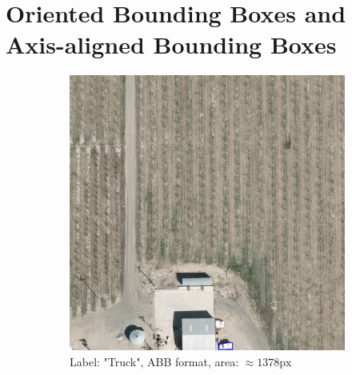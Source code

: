 \section{Oriented Bounding Boxes and Axis-aligned Bounding Boxes}
\begin{figure}[h]
    \centering
    
    \begin{subfigure}[b]{0.45\textwidth}
        \centering
        \includegraphics[trim={550pt 0pt 410pt 990pt},clip,width=\textwidth]{images/015Results/01abb_vs_obb/abb_truck.png}
        \caption{Label: "Truck", ABB format, area: $\approx 1378 \text{px}$}
        \label{fig:abb_truck}
    \end{subfigure}
    \hfill
    \begin{subfigure}[b]{0.45\textwidth}
        \centering

\end{subfigure}
\end{figure}
